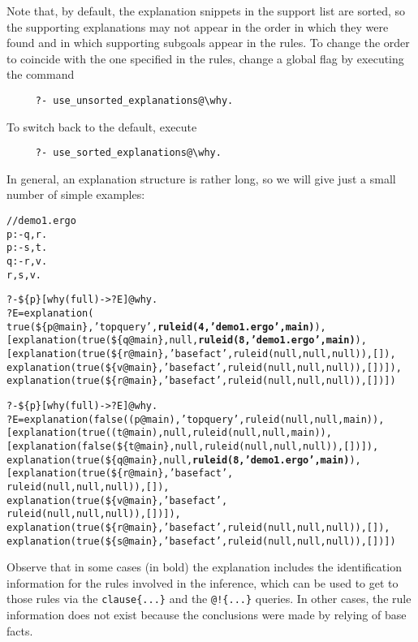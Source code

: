 \begin{itemize}
\begin{itemize}
    Note that, by default, the explanation snippets in the
    support list are sorted, so the supporting
    explanations may not appear in the order in which they were found and in
    which supporting subgoals appear in the rules.
    To change the order to coincide with the one specified in the
    rules, change a global flag by executing the command
\begin{verbatim}
     ?- use_unsorted_explanations@\why.    
\end{verbatim}
    To switch back to the default, execute
\begin{verbatim}
     ?- use_sorted_explanations@\why.    
\end{verbatim}
  \end{itemize}
  In general, an explanation structure is rather long, so we will give just
  a small number of simple examples:
  {\small
\begin{alltt}
// demo1.ergo
p :- q,r.
p :- s, \RULELOGNAF t.
q :- r,v.
r, s, v.

?- \$\{p\}[why(full)->?E]@\bs{}why.
?E=explanation(
       true(\$\{p@main\},'top query',\textbf{ruleid(4,'demo1.ergo',main)}),
        [explanation(true(\$\{q@main\},null,\textbf{ruleid(8,'demo1.ergo',main)}),
           [explanation(true(\$\{r@main\},'base fact',ruleid(null,null,null)),[]),
            explanation(true(\$\{v@main\},'base fact',ruleid(null,null,null)),[])]),
          explanation(true(\$\{r@main\},'base fact',ruleid(null,null,null)),[])])

?- \$\{\RULELOGNAF p\}[why(full)->?E]@\bs{}why.
?E=explanation(false((\RULELOGNAF p@main),'top query',ruleid(null,null,main)),
               [explanation(true((\RULELOGNAF t@main),null,ruleid(null,null,main)),
                 [explanation(false(\$\{t@main\},null,ruleid(null,null,null)),[])]),
                explanation(true(\$\{q@main\},null,\textbf{ruleid(8,'demo1.ergo',main)}),
                             [explanation(true(\$\{r@main\},'base fact',
                                                ruleid(null,null,null)),[]),
                              explanation(true(\$\{v@main\},'base fact',
                                                ruleid(null,null,null)),[])]),
                explanation(true(\$\{r@main\},'base fact',ruleid(null,null,null)),[]),
                explanation(true(\$\{s@main\},'base fact',ruleid(null,null,null)),[])])
\end{alltt}
    }
  Observe that in some cases (in bold) the explanation includes the
  identification information for the rules involved in the inference,
  which can be used to get to those rules via the \texttt{clause\{...\}}
  and the \texttt{@!\{...\}} queries.  
  In other cases, the rule information does not exist because the
  conclusions were made by relying of base facts.


\end{itemize}

